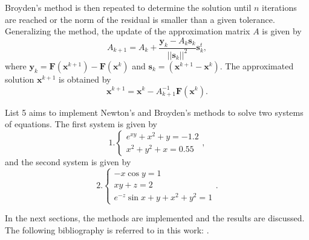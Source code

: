 Broyden's method is then repeated to determine the solution until $n$ iterations are reached or the norm of the residual is smaller than a given tolerance. Generalizing the method, the update of the approximation matrix $A$ is given by
\begin{equation}
    A_{k+1} = A_k + \frac{\bm{y}_k - A_k\bm{s}_k}{||\bm{s}_k||^2}\bm{s}_k^t,
    \label{eq:SecantNDUpdate}
\end{equation}
where $\bm{y}_k = \bm{F}(\bm{x}^{k+1}) - \bm{F}(\bm{x}^k)$ and $\bm{s}_k = \left(\bm{x}^{k+1} - \bm{x}^k\right)$. The approximated solution $\bm{x}^{k+1}$ is obtained by
\begin{equation}
    \bm{x}^{k+1} = \bm{x}^k - A^{-1}_{k+1} \bm{F}(\bm{x}^k).
    \label{eq:SecantNDUpdateX}
\end{equation}

List 5 aims to implement Newton's and Broyden's methods to solve two systems of equations. The first system is given by
\begin{equation}
    1.
    \begin{cases}
        e^{xy} + x^2 + y = -1.2 \\
        x^2 + y^2 + x = 0.55
    \end{cases},
    \label{eq:Sys1}
\end{equation}
and the second system is given by
\begin{equation}
    2.
    \begin{cases}
        -x\cos{y} = 1 \\
        xy + z = 2 \\ 
        e^{-z}\sin{x + y} + x^2 + y^2 = 1
    \end{cases}.
    \label{eq:Sys2}
\end{equation}

In the next sections, the methods are implemented and the results are discussed. The following bibliography is referred to in this work: \cite{de2000metodos,burden1997numerical}.